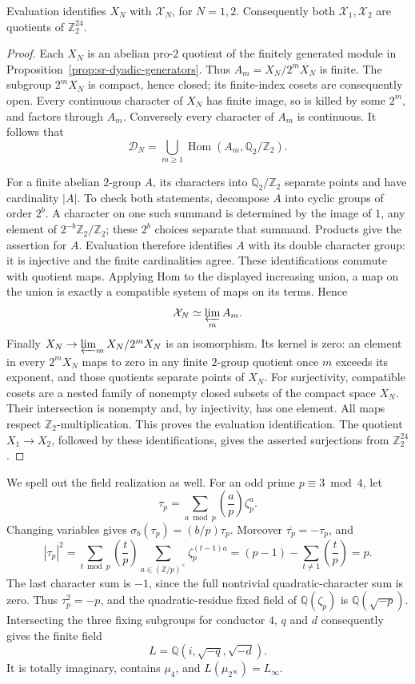 \begin{srlemma}\label{lem:sr-dyadic-bidual}
Evaluation identifies \(X_N\) with \(\mathcal X_N\), for \(N=1,2\).
Consequently both \(\mathcal X_1,\mathcal X_2\) are quotients of
\(\mathbb Z_2^{24}\).
\end{srlemma}
\begin{proof}
Each \(X_N\) is an abelian pro-\(2\) quotient of the finitely generated
module in Proposition~\ref{prop:sr-dyadic-generators}.
Thus \(A_m=X_N/2^mX_N\) is finite.
The subgroup \(2^mX_N\) is compact, hence closed; its finite-index
cosets are consequently open.
Every continuous character of \(X_N\) has finite image, so is killed
by some \(2^m\), and factors through \(A_m\).
Conversely every character of \(A_m\) is continuous.
It follows that
\[
 \mathcal D_N=\bigcup_{m\geq1}
           \operatorname{Hom}(A_m,\mathbb Q_2/\mathbb Z_2).
\]

For a finite abelian \(2\)-group \(A\), its characters into
\(\mathbb Q_2/\mathbb Z_2\) separate points and have cardinality
\(|A|\). To check both statements, decompose \(A\) into cyclic
groups of order \(2^b\). A character on one such summand is
determined by the image of \(1\), any element of
\(2^{-b}\mathbb Z_2/\mathbb Z_2\); these \(2^b\) choices separate
that summand. Products give the assertion for \(A\).
Evaluation therefore identifies \(A\) with its double character
group: it is injective and the finite cardinalities agree.
These identifications commute with quotient maps.
Applying Hom to the displayed increasing union, a map on the union
is exactly a compatible system of maps on its terms. Hence
\[
 \mathcal X_N\simeq\varprojlim_m A_m.
\]
Finally \(X_N\to\varprojlim_mX_N/2^mX_N\) is an isomorphism.
Its kernel is zero: an element in every \(2^mX_N\) maps to zero
in any finite \(2\)-group quotient once \(m\) exceeds its exponent,
and those quotients separate points of \(X_N\).
For surjectivity, compatible cosets are a nested family of
nonempty closed subsets of the compact space \(X_N\).
Their intersection is nonempty and, by injectivity, has one element.
All maps respect \(\mathbb Z_2\)-multiplication.
This proves the evaluation identification.
The quotient \(X_1\to X_2\), followed by these identifications, gives
the asserted surjections from \(\mathbb Z_2^{24}\).
\end{proof}

We spell out the field realization as well.
For an odd prime \(p\equiv3\bmod4\), let
\[
 \tau_p=\sum_{a\bmod p}\left(\frac ap\right)\zeta_p^a .
\]
Changing variables gives
\(\sigma_b(\tau_p)=(b/p)\tau_p\).
Moreover \(\overline{\tau_p}=-\tau_p\), and
\[
 |\tau_p|^2
 =\sum_{t\bmod p}\left(\frac tp\right)
             \sum_{a\in(\mathbb Z/p)^\times}\zeta_p^{(t-1)a}
 =(p-1)-\sum_{t\ne1}\left(\frac tp\right)=p .
\]
The last character sum is \(-1\), since the full nontrivial
quadratic-character sum is zero.
Thus \(\tau_p^2=-p\), and the quadratic-residue fixed field of
\(\mathbb Q(\zeta_p)\) is \(\mathbb Q(\sqrt{-p})\).
Intersecting the three fixing subgroups for conductor \(4\), \(q\)
and \(d\) consequently gives the finite field
\[
                    L=\mathbb Q(i,\sqrt{-q},\sqrt{-d}).
\]
It is totally imaginary, contains \(\mu_4\), and
\(L(\mu_{2^\infty})=L_\infty\).

